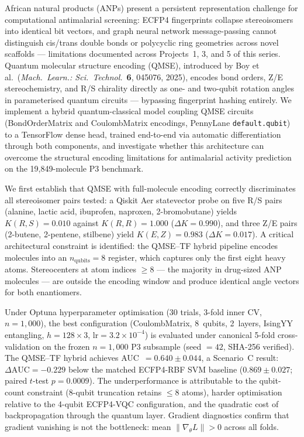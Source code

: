 
African natural products (ANPs) present a persistent representation challenge
for computational antimalarial screening: ECFP4 fingerprints collapse
stereoisomers into identical bit vectors, and graph neural network message-passing
cannot distinguish cis/trans double bonds or polycyclic ring geometries across
novel scaffolds --- limitations documented across Projects~1, 3, and 5 of this
series. Quantum molecular structure encoding (QMSE), introduced by Boy et al.\
(\textit{Mach.\ Learn.: Sci.\ Technol.}\ \textbf{6}, 045076, 2025), encodes
bond orders, Z/E stereochemistry, and R/S chirality directly as one- and
two-qubit rotation angles in parameterised quantum circuits --- bypassing
fingerprint hashing entirely. We implement a hybrid quantum-classical model
coupling QMSE circuits (BondOrderMatrix and CoulombMatrix encodings,
PennyLane \texttt{default.qubit}) to a TensorFlow dense head, trained
end-to-end via automatic differentiation through both components,
and investigate whether this architecture can overcome the structural
encoding limitations for antimalarial activity prediction on the
19{,}849-molecule P3 benchmark.

We first establish that QMSE with full-molecule encoding correctly discriminates
all stereoisomer pairs tested: a Qiskit Aer statevector probe on five R/S pairs
(alanine, lactic acid, ibuprofen, naproxen, 2-bromobutane) yields
$K(R,S) = 0.010$ against $K(R,R) = 1.000$ ($\Delta K = 0.990$), and three
Z/E pairs (2-butene, 2-pentene, stilbene) yield $K(E,Z) = 0.983$ ($\Delta K =
0.017$). A critical architectural constraint is identified: the QMSE--TF hybrid
pipeline encodes molecules into an $n_\text{qubits} = 8$ register, which
captures only the first eight heavy atoms. Stereocenters at atom indices
$\geq 8$ --- the majority in drug-sized ANP molecules --- are outside
the encoding window and produce identical angle vectors for both enantiomers.

Under Optuna hyperparameter optimisation ($30$ trials, 3-fold inner CV,
$n = 1{,}000$), the best configuration (CoulombMatrix, 8~qubits, 2~layers,
IsingYY entangling, $h = 128 \times 3$, $\text{lr} = 3.2 \times 10^{-4}$)
is evaluated under canonical 5-fold cross-validation on the frozen
$n = 1{,}000$ P3 subsample (seed $= 42$, SHA-256 verified). The QMSE--TF hybrid
achieves AUC~$= 0.640 \pm 0.044$, a Scenario~C result:
$\Delta\text{AUC} = -0.229$ below the matched ECFP4-RBF SVM baseline
($0.869 \pm 0.027$; paired $t$-test $p = 0.0009$). The underperformance is
attributable to the qubit-count constraint (8-qubit truncation retains
$\leq 8$ atoms), harder optimisation relative to the 4-qubit ECFP4-VQC
configuration, and the quadratic cost of backpropagation through the quantum
layer. Gradient diagnostics confirm that gradient vanishing is not the
bottleneck: mean $\|\nabla_\theta L\| > 0$ across all folds.

